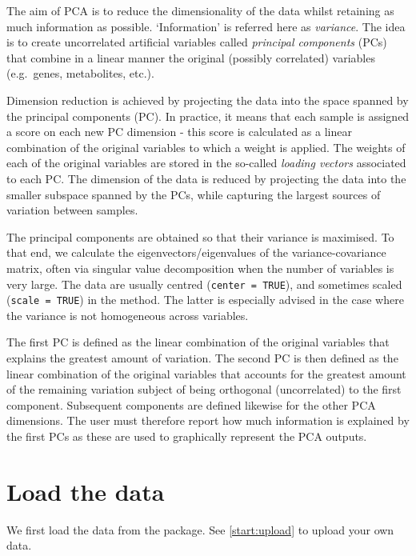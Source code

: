 \documentclass[]{book}
\newenvironment{Shaded}{\begin{snugshade}}{\end{snugshade}}
\newcommand{\KeywordTok}[1]{\textcolor[rgb]{0.13,0.29,0.53}{\textbf{#1}}}
\newcommand{\NormalTok}[1]{#1}
\newcommand{\OperatorTok}[1]{\textcolor[rgb]{0.81,0.36,0.00}{\textbf{#1}}}
\newcommand{\StringTok}[1]{\textcolor[rgb]{0.31,0.60,0.02}{#1}}
\begin{document}
The aim of PCA \citep{Jol05} is to reduce the dimensionality of the data whilst retaining as much information as possible. `Information' is referred here as \emph{variance}. The idea is to create uncorrelated artificial variables called \emph{principal components} (PCs) that combine in a linear manner the original (possibly correlated) variables (e.g.~genes, metabolites, etc.).

Dimension reduction is achieved by projecting the data into the space spanned by the principal components (PC). In practice, it means that each sample is assigned a score on each new PC dimension - this score is calculated as a linear combination of the original variables to which a weight is applied. The weights of each of the original variables are stored in the so-called \emph{loading vectors} associated to each PC. The dimension of the data is reduced by projecting the data into the smaller subspace spanned by the PCs, while capturing the largest sources of variation between samples.

The principal components are obtained so that their variance is maximised. To that end, we calculate the eigenvectors/eigenvalues of the variance-covariance matrix, often via singular value decomposition when the number of variables is very large. The data are usually centred (\texttt{center\ =\ TRUE}), and sometimes scaled (\texttt{scale\ =\ TRUE}) in the method. The latter is especially advised in the case where the variance is not homogeneous across variables.

The first PC is defined as the linear combination of the original variables that explains the greatest amount of variation. The second PC is then defined as the linear combination of the original variables that accounts for the greatest amount of the remaining variation subject of being orthogonal (uncorrelated) to the first component. Subsequent components are defined likewise for the other PCA dimensions. The user must therefore report how much information is explained by the first PCs as these are used to graphically represent the PCA outputs.

\hypertarget{load-the-data}{%
\section{Load the data}\label{load-the-data}}

We first load the data from the package. See \ref{start:upload} to upload your own data.

\begin{Shaded}
\end{Shaded}
\end{document}

